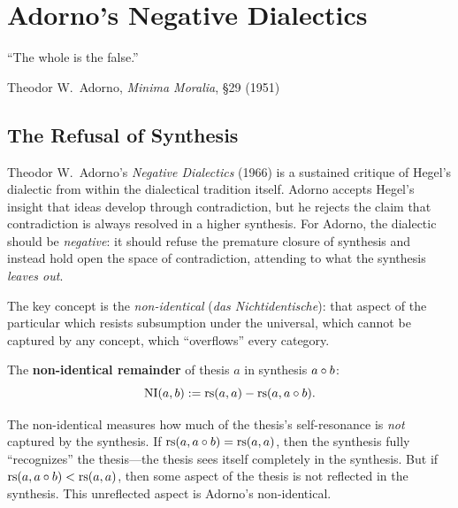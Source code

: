 
\chapter{Adorno's Negative Dialectics}
\label{ch:adorno}

\epigraph{``The whole is the false.''}{Theodor W.\ Adorno, \textit{Minima Moralia}, \S29 (1951)}

\section{The Refusal of Synthesis}

Theodor W.\ Adorno's \textit{Negative Dialectics} (1966) is a sustained
critique of Hegel's dialectic from within the dialectical tradition itself.
Adorno accepts Hegel's insight that ideas develop through contradiction, but
he rejects the claim that contradiction is always resolved in a higher
synthesis. For Adorno, the dialectic should be \emph{negative}: it should
refuse the premature closure of synthesis and instead hold open the space
of contradiction, attending to what the synthesis \emph{leaves out}.

The key concept is the \emph{non-identical} (\textit{das Nichtidentische}):
that aspect of the particular which resists subsumption under the universal,
which cannot be captured by any concept, which ``overflows'' every category.

\begin{definition}
\label{def:non-identical}
The \textbf{non-identical remainder} of thesis $a$ in synthesis $a \circ b$:
\[
\mathrm{NI}(a, b) := \mathrm{rs}(a, a) - \mathrm{rs}(a, a \circ b).
\]
\end{definition}

\begin{interpretation}
The non-identical measures how much of the thesis's self-resonance is \emph{not}
captured by the synthesis. If $\mathrm{rs}(a, a \circ b) = \mathrm{rs}(a, a)$, then the
synthesis fully ``recognizes'' the thesis---the thesis sees itself completely
in the synthesis. But if $\mathrm{rs}(a, a \circ b) < \mathrm{rs}(a, a)$, then some aspect
of the thesis is not reflected in the synthesis. This unreflected aspect is
Adorno's non-identical.
\end{interpretation}

